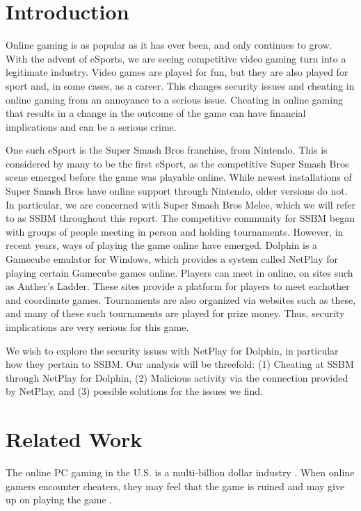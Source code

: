\documentclass[conference]{IEEEtran}
\begin{document}
\section{Introduction}
Online gaming is as popular as it has ever been, and only continues to grow. 
With the advent of eSports, we are seeing competitive video gaming turn into a legitimate industry. Video games are played for fun, but they are also played for sport and, in some cases, as a career. This changes security issues and cheating in online gaming from an annoyance to a serious issue. 
Cheating in online gaming that results in a change in the outcome of the game can have financial implications and can be a serious crime.
	
One such eSport is the Super Smash Bros franchise, from Nintendo.
This is considered by many to be the first eSport, as the competitive Super Smash Bros scene emerged before the game was playable online.
While newest installations of Super Smash Bros have online support through Nintendo, older versions do not.
In particular, we are concerned with Super Smash Bros Melee, which we will refer to as SSBM throughout this report.
The competitive community for SSBM began with groups of people meeting in person and holding tournaments.
However, in recent years, ways of playing the game online have emerged.
Dolphin is a Gamecube emulator for Windows, which provides a system called NetPlay for playing certain Gamecube games online.
Players can meet in online, on sites such as Anther's Ladder.
These sites provide a platform for players to meet eachother and coordinate games.
Tournaments are also organized via websites such as these, and many of these such tournaments are played for prize money. 
Thus, security implications are very serious for this game.

We wish to explore the security issues with NetPlay for Dolphin, in particular how they pertain to SSBM. 
Our analysis will be threefold: (1) Cheating at SSBM through NetPlay for Dolphin, (2) Malicious activity via the connection provided by NetPlay, and (3) possible solutions for the issues we find.


\section{Related Work}
The online PC gaming in the U.S. is a multi-billion dollar industry \cite{takahashi15}. When online gamers encounter cheaters, they may feel that the game is ruined and may give up on playing the game \cite{yan02}. 
\end{document}
